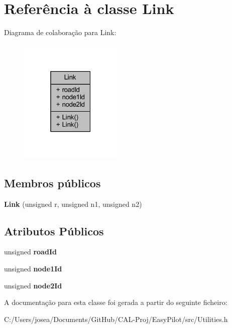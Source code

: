 \hypertarget{class_link}{}\section{Referência à classe Link}
\label{class_link}


Diagrama de colaboração para Link\+:
\nopagebreak
\begin{figure}[H]
\begin{center}
\leavevmode
\includegraphics[width=139pt]{class_link__coll__graph}
\end{center}
\end{figure}
\subsection*{Membros públicos}
\begin{DoxyCompactItemize}
\item 
\hypertarget{class_link_adb501ce3d816ea3a7dd603aa97c8bce6}{}{\bfseries Link} (unsigned r, unsigned n1, unsigned n2)\label{class_link_adb501ce3d816ea3a7dd603aa97c8bce6}

\end{DoxyCompactItemize}
\subsection*{Atributos Públicos}
\begin{DoxyCompactItemize}
\item 
\hypertarget{class_link_a933579cb192194d9158937143e8ab970}{}unsigned {\bfseries road\+Id}\label{class_link_a933579cb192194d9158937143e8ab970}

\item 
\hypertarget{class_link_ac2104772717d9ece063ebd9bac18f4e0}{}unsigned {\bfseries node1\+Id}\label{class_link_ac2104772717d9ece063ebd9bac18f4e0}

\item 
\hypertarget{class_link_a7d3bd226ba9935e42424a296cad221ba}{}unsigned {\bfseries node2\+Id}\label{class_link_a7d3bd226ba9935e42424a296cad221ba}

\end{DoxyCompactItemize}


A documentação para esta classe foi gerada a partir do seguinte ficheiro\+:\begin{DoxyCompactItemize}
\item 
C\+:/\+Users/josea/\+Documents/\+Git\+Hub/\+C\+A\+L-\/\+Proj/\+Easy\+Pilot/src/Utilities.\+h\end{DoxyCompactItemize}
